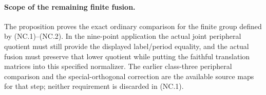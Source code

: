 \paragraph{Scope of the remaining finite fusion.}
The proposition proves the exact ordinary comparison
for the finite group defined by (NC.1)--(NC.2).
In the nine-point application the actual joint
peripheral quotient must still provide the displayed
label/period equality, and the actual fusion must
preserve that lower quotient while putting the
faithful translation matrices into this specified
normalizer.  The earlier class-three peripheral
comparison and the special-orthogonal correction
are the available source maps for that step;
neither requirement is discarded in (NC.1).
